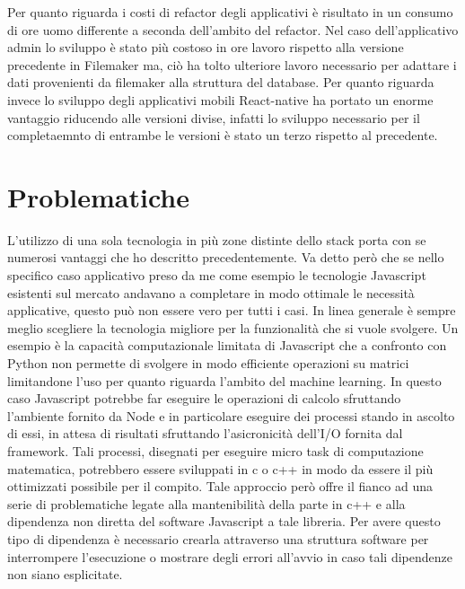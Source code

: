 \vspace{5mm}Per quanto riguarda i costi di refactor degli applicativi è risultato in un consumo di ore uomo differente a seconda dell'ambito del refactor. Nel caso dell'applicativo admin lo sviluppo è stato più costoso in ore lavoro rispetto alla versione precedente in Filemaker ma, ciò ha tolto ulteriore lavoro necessario per adattare i dati provenienti da filemaker alla struttura del database. Per quanto riguarda invece lo sviluppo degli applicativi mobili React-native ha portato un enorme vantaggio riducendo alle versioni divise, infatti lo sviluppo necessario per il completaemnto di entrambe le versioni è stato un terzo rispetto al precedente.

\section{Problematiche}
\vspace{5mm}L'utilizzo di una sola tecnologia in più zone distinte dello stack porta con se numerosi vantaggi che ho descritto precedentemente. Va detto però che se nello specifico caso applicativo preso da me come esempio le tecnologie Javascript esistenti sul mercato andavano a completare in modo ottimale le necessità applicative, questo può non essere vero per tutti i casi. In linea generale è sempre meglio scegliere la tecnologia migliore per la funzionalità che si vuole svolgere. Un esempio è la capacità computazionale limitata di Javascript che a confronto con Python non permette di svolgere in modo efficiente operazioni su matrici limitandone l'uso per quanto riguarda l'ambito del machine learning. In questo caso Javascript potrebbe far eseguire le operazioni di calcolo sfruttando l'ambiente fornito da Node e in particolare eseguire dei processi stando in ascolto di essi, in attesa di risultati sfruttando l'asicronicità dell'I/O fornita dal framework. Tali processi, disegnati per eseguire micro task di computazione matematica, potrebbero essere sviluppati in c o c++ in modo da essere il più ottimizzati possibile per il compito. Tale approccio però offre il fianco ad una serie di problematiche legate alla mantenibilità della parte in c++ e alla dipendenza non diretta del software Javascript a tale libreria. Per avere questo tipo di dipendenza è necessario crearla attraverso una struttura software per interrompere l'esecuzione o mostrare degli errori all'avvio in caso tali dipendenze non siano esplicitate.

